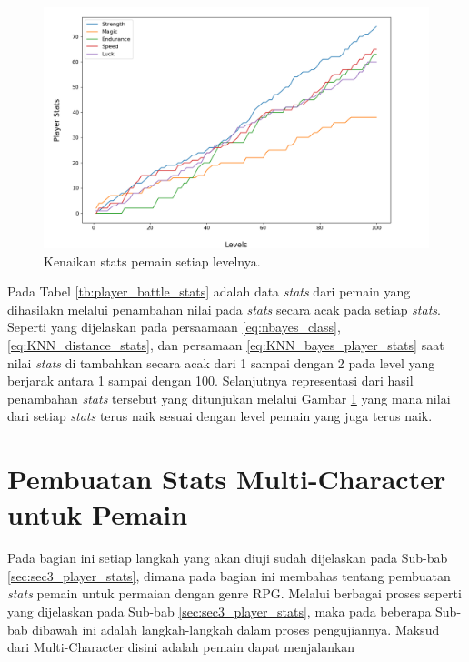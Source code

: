 \begin{figure} [!h] \centering
	\includegraphics[scale=0.50]{img/PlayerStatsDistrib.png}
	\caption{Kenaikan stats pemain setiap levelnya.}
	\label{fig:stats_player}
\end{figure}

Pada Tabel \ref{tb:player_battle_stats} adalah data \textit{stats} dari pemain yang dihasilakn melalui penambahan nilai pada \textit{stats} secara acak pada setiap \textit{stats}. Seperti yang dijelaskan pada persaamaan \ref{eq:nbayes_class}, \ref{eq:KNN_distance_stats}, dan persamaan \ref{eq:KNN_bayes_player_stats} saat nilai \textit{stats} di tambahkan secara acak dari 1 sampai dengan 2 pada level yang berjarak antara 1 sampai dengan 100. Selanjutnya representasi dari hasil penambahan \textit{stats} tersebut yang ditunjukan melalui Gambar \ref{fig:stats_player} yang mana nilai dari setiap \textit{stats} terus naik sesuai dengan level pemain yang juga terus naik. 
\vspace{1ex}

\section{Pembuatan Stats Multi-Character untuk Pemain}
\label{sec:sec4_eval_multi-character_player}
\vspace{1ex}

Pada bagian ini setiap langkah yang akan diuji sudah dijelaskan pada Sub-bab \ref{sec:sec3_player_stats}, dimana pada bagian ini membahas tentang pembuatan \textit{stats} pemain untuk permaian dengan genre RPG. Melalui berbagai proses seperti yang dijelaskan pada Sub-bab \ref{sec:sec3_player_stats}, maka pada beberapa Sub-bab dibawah ini adalah langkah-langkah dalam proses pengujiannya. Maksud dari Multi-Character disini adalah pemain dapat menjalankan 
\vspace{1ex}


